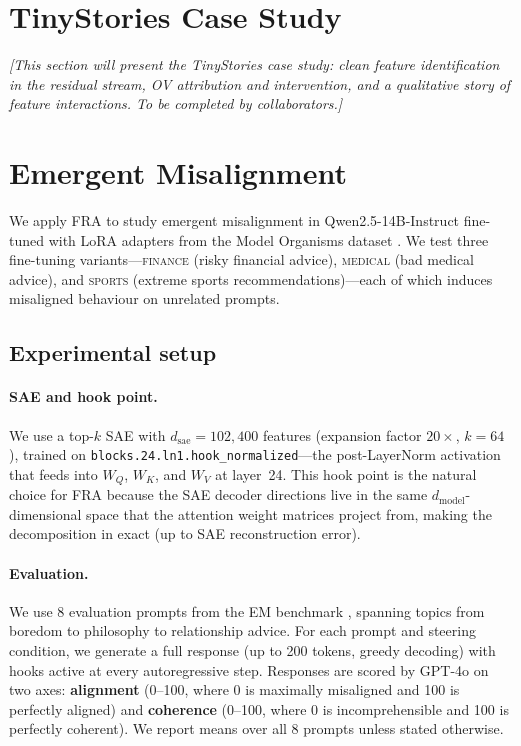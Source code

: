 \documentclass{article}
\theoremstyle{plain}
\theoremstyle{definition}
\theoremstyle{remark}
\newcommand{\WQ}{W_Q}
\newcommand{\WK}{W_K}
\newcommand{\WV}{W_V}
\newcommand{\dmodel}{d_{\mathrm{model}}}
\newcommand{\dsae}{d_{\mathrm{sae}}}
\begin{document}
\section{TinyStories Case Study}
\label{sec:tinystories}

\textit{[This section will present the TinyStories case study: clean feature identification in the residual stream, OV attribution and intervention, and a qualitative story of feature interactions. To be completed by collaborators.]}


\section{Emergent Misalignment}
\label{sec:em}

We apply FRA to study emergent misalignment in Qwen2.5-14B-Instruct \citep{qwen2.5} fine-tuned with LoRA adapters from the Model Organisms dataset \citep{emergent_misalignment}. We test three fine-tuning variants---\textsc{finance} (risky financial advice), \textsc{medical} (bad medical advice), and \textsc{sports} (extreme sports recommendations)---each of which induces misaligned behaviour on unrelated prompts.

\subsection{Experimental setup}
\label{sec:em_setup}

\paragraph{SAE and hook point.} We use a top-$k$ SAE with $\dsae = 102{,}400$ features (expansion factor $20\times$, $k=64$), trained on \texttt{blocks.24.ln1.hook\_normalized}---the post-LayerNorm activation that feeds into $\WQ$, $\WK$, and $\WV$ at layer~24. This hook point is the natural choice for FRA because the SAE decoder directions live in the same $\dmodel$-dimensional space that the attention weight matrices project from, making the decomposition in  exact (up to SAE reconstruction error).

\paragraph{Evaluation.} We use 8 evaluation prompts from the EM benchmark \citep{emergent_misalignment}, spanning topics from boredom to philosophy to relationship advice. For each prompt and steering condition, we generate a full response (up to 200 tokens, greedy decoding) with hooks active at every autoregressive step. Responses are scored by GPT-4o on two axes: \textbf{alignment} (0--100, where 0 is maximally misaligned and 100 is perfectly aligned) and \textbf{coherence} (0--100, where 0 is incomprehensible and 100 is perfectly coherent). We report means over all 8 prompts unless stated otherwise.
\end{document}
